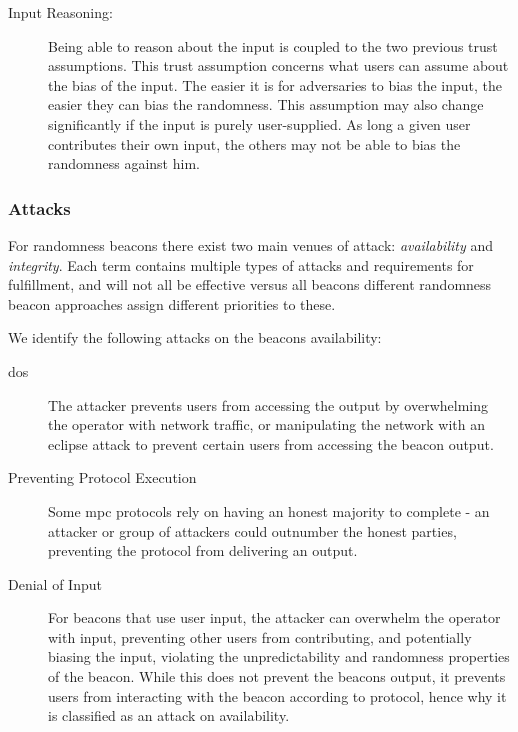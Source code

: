 \begin{description}
    \item [Input Reasoning:]
        Being able to reason about the input is coupled to the two previous trust assumptions. This trust assumption concerns what users can assume about the bias of the input.
        The easier it is for adversaries to bias the input, the easier they can bias the randomness.
        This assumption may also change significantly if the input is purely user-supplied. As long a given user contributes their own input, the others may not be able to bias the randomness against him.



\end{description}


\subsubsection{Attacks}\label{ssub:security_objectives}
For randomness beacons there exist two main venues of attack: \emph{availability} and \emph{integrity}.
Each term contains multiple types of attacks and requirements for fulfillment, and will not all be effective versus all beacons different randomness beacon approaches assign different priorities to these.

We identify the following attacks on the beacons availability:

\begin{description}
    \item [ \acrfull{dos}] The attacker prevents users from accessing the output by overwhelming the operator with network traffic, or manipulating the network with an eclipse attack to prevent certain users from accessing the beacon output.
    \item [ Preventing Protocol Execution ] Some \gls{mpc} protocols rely on having an honest majority to complete - an attacker or group of attackers could outnumber the honest parties, preventing the protocol from delivering an output.
    \item [ Denial of Input ] For beacons that use user input, the attacker can overwhelm the operator with input, preventing other users from contributing, and potentially biasing the input, violating the unpredictability and randomness properties of the beacon. While this does not prevent the beacons output, it prevents users from interacting with the beacon according to protocol, hence why it is classified as an attack on availability.
\end{description}


